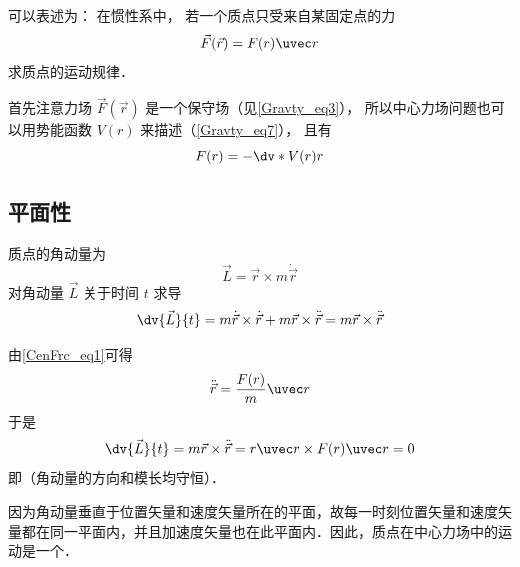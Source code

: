 
 可以表述为： 在惯性系中， 若一个质点只受来自某固定点的力
\begin{equation}\label{CenFrc_eq1}
\vec F(\vec r) = F(r) \uvec r
\end{equation}
求质点的运动规律．

首先注意力场 $\vec F(\vec r)$ 是一个保守场（见\autoref{Gravty_eq3}）， 所以中心力场问题也可以用势能函数 $V(r)$ 来描述（\autoref{Gravty_eq7}）， 且有
\begin{equation}
F(r) = -\dv*{V(r)}{r}
\end{equation}

\subsection{平面性}
质点的角动量为
\begin{equation}
\vec L =\vec r \times m \dot{\vec r}
\end{equation}
对角动量 $\vec L$ 关于时间 $t$ 求导
\begin{equation}
\dv{\vec L}{t} =m \dot{\vec r} \times \dot{\vec r} +m \vec r \times \ddot{\vec r}=m \vec r \times \ddot{\vec r}
\end{equation}

由\autoref{CenFrc_eq1}可得
\begin{equation}
\ddot{\vec r} = \frac{F(r)}{m}\uvec r
\end{equation}
于是
\begin{equation}
\dv{\vec L}{t} =m \vec r \times \ddot{\vec r}= r \uvec r \times F(r)\uvec r=0
\end{equation}
即（角动量的方向和模长均守恒）．

因为角动量垂直于位置矢量和速度矢量所在的平面，故每一时刻位置矢量和速度矢量都在同一平面内，并且加速度矢量也在此平面内．因此，质点在中心力场中的运动是一个．

